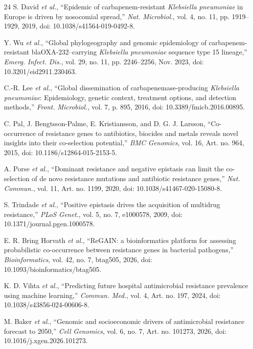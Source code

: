 \documentclass[journal]{IEEEtran}
\begin{document}
{\begin{thebibliography}{24}
S. David \textit{et al.}, ``Epidemic of carbapenem-resistant \textit{Klebsiella pneumoniae} in Europe is driven by nosocomial spread,'' \textit{Nat. Microbiol.}, vol. 4, no. 11, pp. 1919--1929, 2019, doi: 10.1038/s41564-019-0492-8.

Y. Wu \textit{et al.}, ``Global phylogeography and genomic epidemiology of carbapenem-resistant blaOXA-232--carrying \textit{Klebsiella pneumoniae} sequence type 15 lineage,'' \textit{Emerg. Infect. Dis.}, vol. 29, no. 11, pp. 2246--2256, Nov. 2023, doi: 10.3201/eid2911.230463.

C.-R. Lee \textit{et al.}, ``Global dissemination of carbapenemase-producing \textit{Klebsiella pneumoniae}: Epidemiology, genetic context, treatment options, and detection methods,'' \textit{Front. Microbiol.}, vol. 7, p. 895, 2016, doi: 10.3389/fmicb.2016.00895.

C. Pal, J. Bengtsson-Palme, E. Kristiansson, and D. G. J. Larsson, ``Co-occurrence of resistance genes to antibiotics, biocides and metals reveals novel insights into their co-selection potential,'' \textit{BMC Genomics}, vol. 16, Art. no. 964, 2015, doi: 10.1186/s12864-015-2153-5.

A. Porse \textit{et al.}, ``Dominant resistance and negative epistasis can limit the co-selection of de novo resistance mutations and antibiotic resistance genes,'' \textit{Nat. Commun.}, vol. 11, Art. no. 1199, 2020, doi: 10.1038/s41467-020-15080-8.

S. Trindade \textit{et al.}, ``Positive epistasis drives the acquisition of multidrug resistance,'' \textit{PLoS Genet.}, vol. 5, no. 7, e1000578, 2009, doi: 10.1371/journal.pgen.1000578.

E. R. Bring Horvath \textit{et al.}, ``ReGAIN: a bioinformatics platform for assessing probabilistic co-occurrence between resistance genes in bacterial pathogens,'' \textit{Bioinformatics}, vol. 42, no. 7, btag505, 2026, doi: 10.1093/bioinformatics/btag505.

K. D. Vihta \textit{et al.}, ``Predicting future hospital antimicrobial resistance prevalence using machine learning,'' \textit{Commun. Med.}, vol. 4, Art. no. 197, 2024, doi: 10.1038/s43856-024-00606-8.

M. Baker \textit{et al.}, ``Genomic and socioeconomic drivers of antimicrobial resistance forecast to 2050,'' \textit{Cell Genomics}, vol. 6, no. 7, Art. no. 101273, 2026, doi: 10.1016/j.xgen.2026.101273.


\end{thebibliography}}
\end{document}
